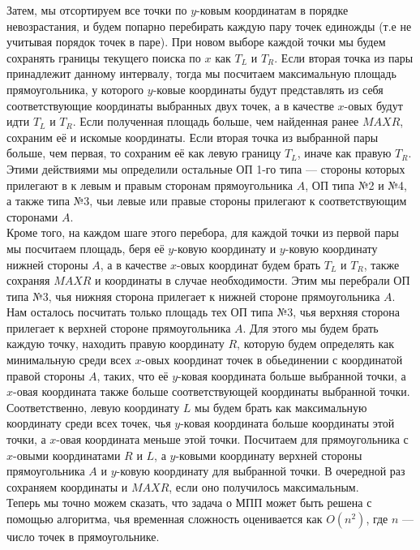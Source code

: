 \documentclass[12pt,a4paper]{article}
\begin{document}
{Затем, мы отсортируем все точки по $y$-ковым координатам в порядке невозрастания, и будем попарно перебирать каждую пару точек единожды (т.е не учитывая порядок точек в паре). При новом выборе каждой точки мы будем сохранять границы текущего поиска
по $x$ как $T_L$ и $T_R$. Если вторая точка из пары принадлежит данному интервалу, тогда мы посчитаем максимальную площадь прямоугольника, у которого $y$-ковые координаты будут представлять из себя соответствующие координаты выбранных двух точек, а в качестве $x$-овых будут идти $T_L$ и $T_R$. Если полученная площадь больше, чем найденная ранее $MAXR$, сохраним её и искомые координаты. Если вторая точка из выбранной пары больше, чем первая, то сохраним её как левую границу $T_L$, иначе как правую $T_R$. Этими действиями мы определили остальные ОП 1-го типа — стороны которых прилегают в к левым и правым сторонам прямоугольника $A$, ОП типа №2 и №4, а также типа №3, чьи левые или правые стороны прилегают к соответствующим сторонами $A$.  \\
Кроме того, на каждом шаге этого перебора, для каждой точки из первой пары мы посчитаем площадь, беря её $y$-ковую координату и $y$-ковую координату нижней стороны $A$, а в качестве $x$-овых координат будем брать $T_L$ и $T_R$, также сохраняя $MAXR$ и координаты в случае необходимости. Этим мы перебрали ОП типа №3, чья нижняя сторона прилегает к нижней стороне прямоугольника $A$. \\
Нам осталось посчитать только площадь тех ОП типа №3, чья верхняя сторона прилегает к верхней стороне прямоугольника $A$. Для этого мы будем брать каждую точку, находить правую координату $R$, которую будем определять как минимальную среди всех $x$-овых координат точек в обьединении с координатой правой стороны $A$, таких, что её $y$-ковая координата больше выбранной точки, а $x$-овая координата также больше соответствующей координаты выбранной точки. Соответственно, левую координату $L$ мы будем брать как максимальную координату среди всех точек, чья $y$-ковая координата больше координаты этой точки, а $x$-овая координата меньше этой точки. Посчитаем для прямоугольника с $x$-овыми координатами $R$ и $L$, а $y$-ковыми координату верхней стороны прямоугольника $A$ и $y$-ковую координату для выбранной точки. В очередной раз сохраняем координаты и $MAXR$, если оно получилось максимальным. \\
Теперь мы точно можем сказать, что задача о МПП может быть решена с помощью алгоритма, чья временная сложность оценивается как $O(n^2)$, где $n$ — число точек в прямоугольнике.\\
}
\end{document}
